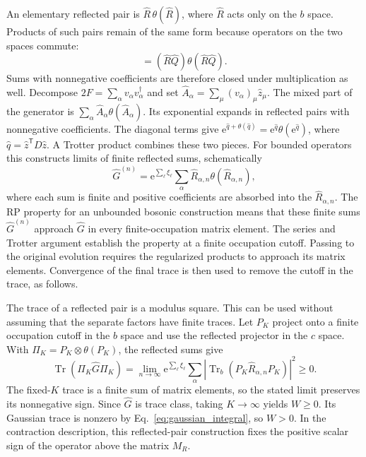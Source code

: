 \documentclass[11pt,a4paper]{article}
\newcommand{\Tr}{\operatorname{Tr}}
\newcommand{\ee}{\mathrm e}
\newcommand{\trans}{\mathsf T}
\numberwithin{equation}{section}
\begin{document}
An elementary reflected pair is $\hat R\,\theta(\hat R)$, where
$\hat R$ acts only on the $b$ space. Products of such pairs remain
of the same form because operators on the two spaces commute:
\begin{equation}
 [\hat R\,\theta(\hat R)][\hat Q\,\theta(\hat Q)]
 =(\hat R\hat Q)\theta(\hat R\hat Q).
 \label{eq:rp_product}
\end{equation}
Sums with nonnegative coefficients are therefore closed under
multiplication as well. Decompose
$2F=\sum_\alpha v_\alpha v_\alpha^\dagger$ and set
$\hat A_\alpha=\sum_\mu(v_\alpha)_\mu\hat z_\mu$.
The mixed part of the generator is
$\sum_\alpha\hat A_\alpha\theta(\hat A_\alpha)$.
Its exponential expands in reflected pairs with nonnegative
coefficients. The diagonal terms give
$\ee^{\hat q+\theta(\hat q)}
=\ee^{\hat q}\theta(\ee^{\hat q})$, where
$\hat q=\hat z^\trans D\hat z$.
A Trotter product combines these two pieces. For bounded operators this
constructs limits of finite reflected sums, schematically
\begin{equation}
 \hat G^{(n)}=\ee^{\sum_\ell\xi_\ell}
 \sum_\alpha\hat R_{\alpha,n}\theta(\hat R_{\alpha,n}),
 \label{eq:rp_sum}
\end{equation}
where each sum is finite and positive coefficients are absorbed into
the $\hat R_{\alpha,n}$.
The RP property for an unbounded bosonic construction means that these
finite sums $\hat G^{(n)}$ approach $\hat G$ in every finite-occupation
matrix element.
The series and Trotter argument establish the property at a finite
occupation cutoff. Passing to the original evolution requires the
regularized products to approach its matrix elements.
Convergence of the final trace is then used to remove the cutoff in the
trace, as follows.

The trace of a reflected pair is a modulus square. This can be used
without assuming that the separate factors have finite traces.
Let $P_K$ project onto a finite occupation cutoff in the $b$ space
and use the reflected projector in the $c$ space. With
$\Pi_K=P_K\otimes\theta(P_K)$, the reflected sums give
\begin{equation}
 \Tr(\Pi_K\hat G\Pi_K)
 =\lim_{n\to\infty}\ee^{\sum_\ell\xi_\ell}
 \sum_\alpha
 \left|\Tr_b(P_K\hat R_{\alpha,n}P_K)\right|^2\geq0.
 \label{eq:rp_cutoff_trace}
\end{equation}
The fixed-$K$ trace is a finite sum of matrix elements, so the stated
limit preserves its nonnegative sign.
Since $\hat G$ is trace class, taking $K\to\infty$ yields
$W\geq0$. Its Gaussian trace is nonzero by
Eq.~\eqref{eq:gaussian_integral}, so $W>0$.
In the contraction description, this reflected-pair construction fixes
the positive scalar sign of the operator above the matrix $M_R$.
\end{document}
